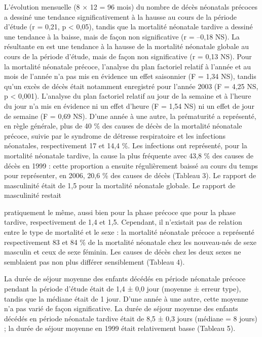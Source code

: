 \documentclass[
]{book}
\begin{document}
L'évolution mensuelle (8 × 12 = 96 mois) du nombre de décès néonatals précoces a dessiné une tendance significativement à la hausse au cours de la période d'étude (r = 0,21, p \textless{} 0,05), tandis que la mortalité néonatale tardive a dessiné une tendance à la baisse, mais de façon non significative (r = --0,18 NS). La résultante en est une tendance à la hausse de la mortalité néonatale globale au cours de la période d'étude, mais de façon non significative (r = 0,13 NS). Pour la mortalité néonatale précoce, l'analyse du plan factoriel relatif à l'année et au mois de l'année n'a pas mis en évidence un effet saisonnier (F = 1,34 NS), tandis qu'un excès de décès était notamment enregistré pour l'année 2003 (F = 4,25 NS, p \textless{} 0,001). L'analyse du plan factoriel relatif au jour de la semaine et à l'heure du jour n'a mis en évidence ni un effet d'heure (F = 1,54 NS) ni un effet de jour de semaine (F = 0,69 NS). D'une année à une autre, la prématurité a représenté, en règle générale, plus de 40 \% des causes de décès de la mortalité néonatale précoce, suivie par le syndrome de détresse respiratoire et les infections néonatales, respectivement 17 et 14,4 \%. Les infections ont représenté, pour la mortalité néonatale tardive, la cause la plus fréquente avec 43,8 \% des causes de décès en 1999 : cette proportion a ensuite régulièrement baissé au cours du temps pour représenter, en 2006, 20,6 \% des causes de décès (Tableau 3). Le rapport de masculinité était de 1,5 pour la mortalité néonatale globale. Le rapport de masculinité restait

pratiquement le même, aussi bien pour la phase précoce que pour la phase tardive, respectivement de 1,4 et 1,5. Cependant, il n'existait pas de relation entre le type de mortalité et le sexe : la mortalité néonatale précoce a représenté respectivement 83 et 84 \% de la mortalité néonatale chez les nouveau-nés de sexe masculin et ceux de sexe féminin. Les causes de décès chez les deux sexes ne semblaient pas non plus différer sensiblement (Tableau 4).

La durée de séjour moyenne des enfants décédés en période néonatale précoce pendant la période d'étude était de 1,4 ± 0,0 jour (moyenne ± erreur type), tandis que la médiane était de 1 jour. D'une année à une autre, cette moyenne n'a pas varié de façon significative. La durée de séjour moyenne des enfants décédés en période néonatale tardive était de 8,5 ± 0,3 jours (médiane = 8 jours) ; la durée de séjour moyenne en 1999 était relativement basse (Tableau 5).
\end{document}
